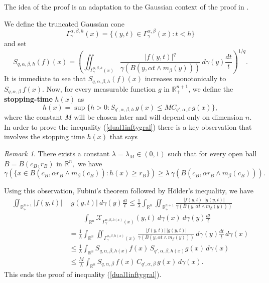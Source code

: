 \documentclass[leqno,11pt]{amsart}
\theoremstyle{plain}
\theoremstyle{remark}
\newtheorem{remark}{Remark}
\begin{document}
{ 
The idea of the proof is an adaptation to the Gaussian context of the proof in \cite[p. 313-314]{cms}.
{We define the truncated Gaussian cone $$\Gamma_\gamma^{\alpha, \beta, h}(x)=\{(y,t)\in \Gamma^{\alpha,\beta}_\gamma(x): t<h\}$$ and set
$$S_{q,\alpha,\beta,h} (f)(x)=\left(\iint_{\Gamma^{\alpha, \beta, h}_\gamma(x)}\frac{|f(y,t)|^q}{\gamma(B(y,\alpha t\wedge m_\beta(y)))}\, d\gamma (y)\frac{dt}{t}\right)^{1/q}.$$
It is immediate to see that $S_{q,\alpha, \beta,h}(f)(x)$ increases monotonically to   $S_{q,\alpha, \beta }\, f(x).$ Now, for every measurable function $g$ in $\mathbb{R}^{n+1}_+$, we define the {\bf stopping-time} $h(x)$ as
$$h(x)=\sup\{h>0: S_{q',\alpha, \beta,h}\, g(x)\le M C_{q',\alpha, \beta}\, g (x)\},$$
where the constant $M$ will be chosen later and will depend only on dimension $n$. In order to prove the inequality (\ref{dual1inftygral}) there is a key observation that involves the stopping time $h(x)$ that says
\begin{remark}\label{porcion}
There exists a constant $\lambda=\lambda_M\in (0,1)$ such that for every open ball $B=B(c_B,r_B)$ in $\mathbb{R}^n,$ we have \begin{equation}\label{puntosdensidad}
\gamma(\{x\in B(c_B, \alpha r_B\wedge m_\beta(c_B)): h(x)\ge r_B\})\ge \lambda\ \gamma (B(c_B, \alpha r_B\wedge m_\beta(c_B))).
\end{equation}
\end{remark}
Using this observation, Fubini's theorem followed by H\"older's inequality, we have
\begin{align*}
\iint_{\mathbb{R}^{n+1}_+}|f(y,t)|\, &|g(y,t)|\ d\gamma(y)\frac{dt}{t} \le \frac{1}{\lambda}\int_{\mathbb{R}^n}\iint_{\mathbb{R}^{n+1}_+}\frac{|f(y,t)|\, |g(y,t)|}{\gamma(B(y, \alpha t\wedge m_\beta (y)))}\\ & \qquad \int_{\mathbb{R}^n}\mathcal{X}_{\Gamma_\gamma^{\alpha, \beta, h(x)}(x)}(y,t)\, d\gamma(x) \ d\gamma(y)\frac{dt}{t}\\ &=\frac{1}{\lambda}\int_{\mathbb{R}^n}\iint_{\Gamma_\gamma^{\alpha, \beta, h(x)}(x)}\frac{|f(y,t)|\, |g(y,t)|}{\gamma(B(y,\alpha t\wedge m_\beta (y)))}\, d\gamma(y)\frac{dt}{t}\,  d\gamma(x)\\ &\le \frac{1}{\lambda}\int_{\mathbb{R}^n} S_{q,\alpha, \beta, h(x)} f (x)\, S_{q',\alpha, \beta,  h(x)} g (x)\, d\gamma(x)\\ & \le \frac{M}{\lambda}\int_{\mathbb{R}^n} S_{q,\alpha,\beta}\, f(x)\, C_{q',\alpha,\beta}\, g (x)\, d\gamma(x).
\end{align*}
This ends the proof of inequality (\ref{dual1inftygral}).
}}
\end{document}
